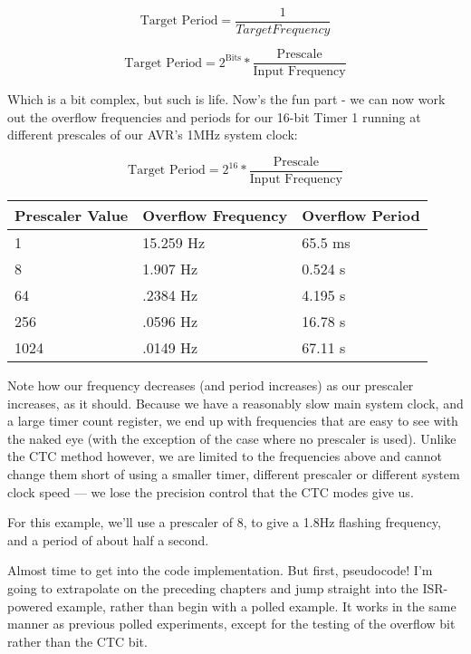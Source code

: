 \documentclass[a4paper,oneside]{book}
\begin{document}
\begin{displaymath}
\text{Target Period} = \frac{1}{Target Frequency}
\end{displaymath}

\begin{displaymath}
\text{Target Period} = 2^\text{Bits} * \frac{\text{Prescale}}{\text{Input Frequency}}
\end{displaymath}

Which is a bit complex, but such is life. Now's the fun part - we can now work out the overflow frequencies and periods for our 16-bit Timer 1 running at different prescales of our AVR's 1MHz system clock:

\begin{displaymath}
\text{Target Period} = 2^16 * \frac{\text{Prescale}}{\text{Input Frequency}}
\end{displaymath}

\begin{center}
\begin{tabular}{|l|l|l|}
	\hline
	Prescaler Value & Overflow Frequency & Overflow Period  \\
	\hline
	1    & 15.259 Hz & 65.5 ms \\
	8    & 1.907 Hz  & 0.524 s \\
	64   & .2384 Hz  & 4.195 s \\
	256  & .0596 Hz  & 16.78 s \\
	1024 & .0149 Hz  & 67.11 s \\
	\hline
\end{tabular}
\end{center}

Note how our frequency decreases (and period increases) as our prescaler increases, as it should. Because we have a reasonably slow main system clock, and a large timer count register, we end up with frequencies that are easy to see with the naked eye (with the exception of the case where no prescaler is used). Unlike the CTC method however, we are limited to the frequencies above and cannot change them short of using a smaller timer, different prescaler or different system clock speed --- we lose the precision control that the CTC modes give us.

For this example, we'll use a prescaler of 8, to give a 1.8Hz flashing frequency, and a period of about half a second.

Almost time to get into the code implementation. But first, pseudocode! I'm going to extrapolate on the preceding chapters and jump straight into the ISR-powered example, rather than begin with a polled example. It works in the same manner as previous polled experiments, except for the testing of the overflow bit rather than the CTC bit. 
\end{document}
